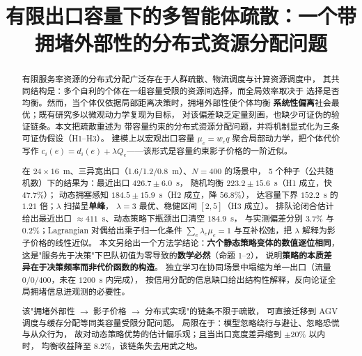 \title{有限出口容量下的多智能体疏散：一个带拥堵外部性的分布式资源分配问题}
\author{}
\date{}


\maketitle

\begin{abstract}
有限服务率资源的分布式分配广泛存在于人群疏散、物流调度与计算资源调度中，
其共同结构是：多个自利的个体在一组容量受限的资源间选择，而全局效率取决于
选择是否均衡。然而，当个体仅依据局部距离决策时，拥堵外部性使个体均衡
\textbf{系统性偏离}社会最优；既有研究多以微观动力学复现为目标，
对该偏差缺乏定量刻画，也缺少可证伪的验证链条。本文把疏散重述为
带容量约束的分布式资源分配问题，并将机制显式化为三条可证伪假设（H1--H3）。
建模上以宏观出口容量 $\mu_e=w_e q$ 聚合局部动力学，把个体代价写作
$c_i(e)=d_i(e)+\lambda Q_e$——该形式是容量约束影子价格的一阶近似。

在 $24\times16$~m、三异宽出口（1.6/1.2/0.8~m）、$N=400$ 的场景中，
5 个种子（公共随机数）下的结果为：最近出口 $426.7\pm6.0$~s，
随机均衡 $223.2\pm15.6$~s（H1 成立，快 $47.7\%$）；
动态拥塞感知 $\mathbf{184.5\pm15.9}$~s（H2 成立，降 $56.8\%$），
达容量下界 $152.2$~s 的 $1.21$ 倍；$\lambda$ 扫描呈\textbf{单峰}，
$\lambda=3$ 最优、稳健区间 $[2,5]$（H3 成立）。
排队论闭合估计给出最近出口 $\approx411$~s、动态策略下瓶颈出口清空 $184.9$~s，
与实测偏差分别 $3.7\%$ 与 $0.2\%$；Lagrangian 对偶给出乘子归一化条件
$\sum_e\lambda_e\mu_e=1$ 与互补松弛，把 $\lambda$ 解释为影子价格的线性近似。
本文另给出一个方法学结论：\textbf{六个静态策略变体的数值逐位相同}，
这是"服务先于决策"下巴队初值为零导致的\textbf{数学必然}（命题 1--2），
说明\textbf{策略的本质差异在于决策频率而非代价函数的构造}。
独立学习在协同场景中塌缩为单一出口（流量 $0/0/400$，未在 $1200$~s 内完成），
按信用分配的信息缺口给出结构性解释，反向论证全局拥堵信息进观测的必要性。

该"拥堵外部性 $\to$ 影子价格 $\to$ 分布式实现"的链条不限于疏散，
可直接迁移到 AGV 调度与缓存分配等同类容量受限分配问题。
局限在于：模型忽略绕行与避让、忽略恐慌与从众行为，
故对动态策略优势的估计偏乐观；且当出口宽度差异缩到 $\pm20\%$ 以内时，
均衡收益降至 $8.2\%$，该链条失去用武之地。

\end{abstract}

